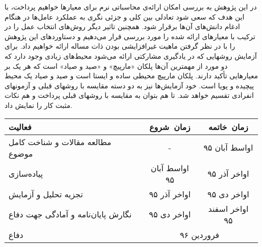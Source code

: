 \documentclass[12pt,a4paper]{article}
\newcommand{\renderref}[1] { \begingroup \let\clearpage\relax  \endgroup }
\begin{document}
در این پژوهش به بررسی امکان ارائه‌ی محاسباتی نرم برای معیار‌ها خواهیم پرداخت، با این هدف که سعی شود تعادلی بین کلی و جزئی نگری به عملکرد عامل‌ها در هنگام ادغام دانش‌های آن‌ها برقرار شود. همچنین تاثیر دیگر روش‌های انتخاب عمل را در ترکیب با معیار‌های ارائه شده را مورد بررسی قرار  می‌دهیم و دستاورد‌های این پژوهش را با در نظر گرفتن ماهیت غیرافزایشی بودن ذات مساله ارائه خواهیم داد.
\vspace{-.5em}
برای آزمایش روشهایی که در یادگیری مشارکتی ارائه می‌شود محیط‌های زیادی وجود دارد که دو مورد از مهمترین آن‌ها
پلکان «مارپیچ» و «صید و صیاد» است که هر یک بر معیارهایی تأکید دارند. پلکان مارپیچ محیطی ساده و ایستا است و صید و صیاد یک
محیط پیچیده و پویا است. خود آزمایش‌ها نیز به دو دسته مقایسه با روشهای قبلی و آزمونهای انفرادی تقسیم خواهد شد. تا هم
بتوان به مقایسه با روشهای قبلی پرداخت و هم نکات مثبت کار را نمایش داد.
\vspace{-.5em}
\vspace{-1em}
\begin{table}[h!]
\centering
\begin{tabular}{p{8cm}|c|c}
فعالیت & زمان\ شروع & زمان\ خاتمه
\\\hline
 مطالعه مقالات و شناخت کامل موضوع & - & اواسط آبان ۹۵
\\\hline
پیاده‌سازی & اواسط آبان ۹۵ & اواخر آذر ۹۵
\\\hline
تجزیه تحلیل و آزمایش & اواخر آذر ۹۵ & اواخر دی ۹۵
\\\hline
نگارش پایان‌نامه و آمادگی جهت دفاع & اواخر دی ۹۵ & اواخر اسفند ۹۵
\\\hline
دفاع & \multicolumn{2}{c}{فروردین ۹۶}
\end{tabular}
\end{table}

\renderref{reference}
\end{document}
